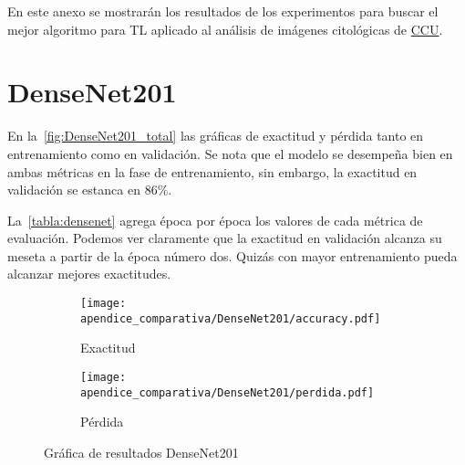 En este anexo se mostrarán los resultados de los experimentos para buscar el
mejor algoritmo para TL aplicado al análisis de imágenes citológicas de
\hyperlink{abbr}{CCU}. 

\section{DenseNet201}
En la~\autoref{fig:DenseNet201_total} las gráficas de exactitud y pérdida tanto
en entrenamiento como en validación. Se nota que el modelo se desempeña bien en
ambas métricas en la fase de entrenamiento, sin embargo, la exactitud en
validación se estanca en 86\%.

La~\autoref{tabla:densenet} agrega época por época los valores de cada métrica
de evaluación. Podemos ver claramente que la exactitud en validación alcanza su
meseta a partir de la época número dos. Quizás con mayor entrenamiento pueda
alcanzar mejores exactitudes.

\begin{figure}[H]
    \centering
    \begin{subfigure}[b]{0.6\textwidth}
        \centering
       \texttt{[image: apendice\_comparativa/DenseNet201/accuracy.pdf]}
       \caption{Exactitud}\label{fig:accuracy_dense} 
    \end{subfigure}

    \begin{subfigure}[b]{0.6\textwidth}
        \centering
       \texttt{[image: apendice\_comparativa/DenseNet201/perdida.pdf]}
       \caption{Pérdida}\label{fig:perdida_dense}
    \end{subfigure}
    \caption{Gráfica de resultados DenseNet201}\label{fig:DenseNet201_total}
\end{figure}


